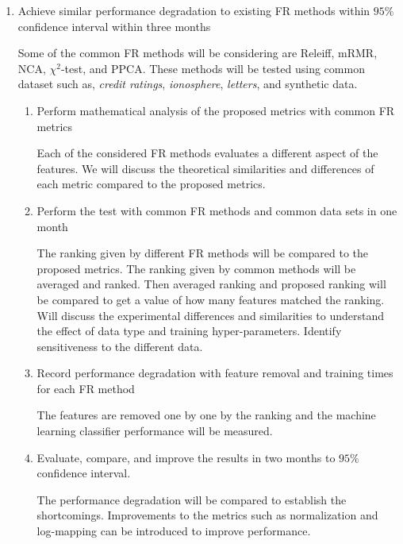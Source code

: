 \documentclass[11pt]{article}
\begin{document}
\begin{enumerate}
    \item Achieve similar performance degradation to existing FR methods within $95\%$ confidence interval within three months
    
    Some of the common FR methods will be considering are Releiff\cite{Kononenko1997}, mRMR\cite{Ding2005}, NCA\cite{Goldberger2005}, $\chi^2$-test, and PPCA\cite{Tipping1999}. These methods will be tested using common dataset such as, \textit{credit ratings}, \textit{ionosphere}, \textit{letters}, and synthetic data.    
    
    
    \begin{enumerate}
        \item Perform mathematical analysis of the proposed metrics with common FR metrics
        
        Each of the considered FR methods evaluates a different aspect of the features. We will discuss the theoretical similarities and differences of each metric compared to the proposed metrics.
        
        \item Perform the test with common FR methods and common data sets in one month
        
        The ranking given by different FR methods will be compared to the proposed metrics. The ranking given by common methods will be averaged and ranked. Then averaged ranking and proposed ranking will be compared to get a value of how many features matched the ranking.  Will discuss the experimental differences and similarities to understand the effect of data type and training hyper-parameters. Identify sensitiveness to the different data.
        
        \item Record performance degradation with feature removal and training times for each FR method
        
        The features are removed one by one by the ranking and the machine learning classifier performance will be measured. 
        
        \item Evaluate, compare, and improve the results in two months to $95\%$ confidence interval.
        
        The performance degradation will be compared to establish the shortcomings. Improvements to the metrics such as normalization and log-mapping can be introduced to improve performance.
        

\end{enumerate}
\end{enumerate}
\end{document}
